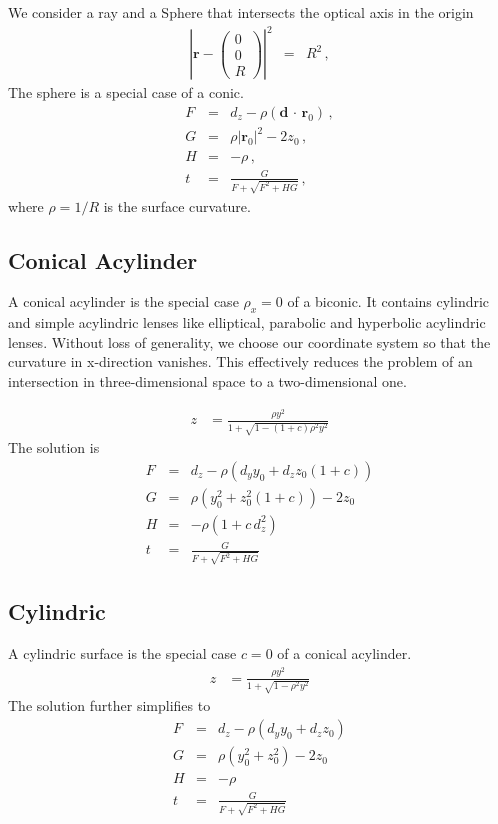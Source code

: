 \documentclass[12pt,a4paper,twoside,openright,BCOR10mm,headsepline,titlepage,abstracton,chapterprefix,final]{scrreprt}
\newcommand\Vector[1]{{\mathbf{#1}}}
\newcommand\Location{\Vector{r}}
\newcommand{\scpm}[2]{(#1\,\cdot\,#2)}
\begin{document}
We consider a ray and a Sphere that intersects the optical axis in the origin
\begin{eqnarray}
 \left| \Location - \begin{pmatrix} 0 \\ 0 \\ R \end{pmatrix} \right|^2 &=& R^2\,, \label{eq:sphereeq}
\end{eqnarray}
The sphere is a special case of a conic.
\begin{subequations}
\label{eq:spheresolution}
\begin{eqnarray}
   F &=& d_z - \rho \scpm{\Vector{d}}{\Location_0}\,, \\
   G &=& \rho |\Location_0|^2 - 2 z_0\,, \\
   H &=& - \rho\,, \\
   t &=& \frac{G}{ F + \sqrt{F^2 + H G} }\,, \label{eq:tsolsphere}
\end{eqnarray}
\end{subequations}
where $\rho = 1 / R$ is the surface curvature. 

\subsection{Conical Acylinder}
A conical acylinder is the special case $\rho_x=0$ of a biconic. It contains cylindric and simple acylindric lenses like elliptical, parabolic and hyperbolic acylindric lenses.
Without loss of generality, we choose our coordinate system so that the curvature in x-direction vanishes.
This effectively reduces the problem of an intersection in three-dimensional space to a two-dimensional one.

\begin{align}
 z &= \frac{ \rho y^2}{1 + \sqrt{1 - (1+c) \rho^2 y^2}}
\end{align}
The solution is
\begin{eqnarray}
   F &=& d_z - \rho \left(  d_y y_0 + d_z z_0 (1+c) \right) \\
   G &=& \rho ( y_0^2 + z_0^2 (1+c)) - 2 z_0 \\
   H &=& - \rho ( 1 + c \, d_z^2 ) \\
   t &=& \frac{G}{ F + \sqrt{F^2 + H G} }
\end{eqnarray}


\subsection{Cylindric}
A cylindric surface is the special case $c = 0$ of a conical acylinder.
\begin{align}
 z &= \frac{ \rho y^2}{1 + \sqrt{1 - \rho^2 y^2}}
\end{align}
The solution further simplifies to
\begin{eqnarray}
   F &=& d_z - \rho \left(  d_y y_0 + d_z z_0  \right) \\
   G &=& \rho ( y_0^2 + z_0^2 ) - 2 z_0 \\
   H &=& - \rho \\
   t &=& \frac{G}{ F + \sqrt{F^2 + H G} }
\end{eqnarray}
\end{document}
